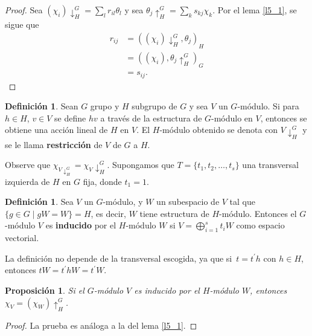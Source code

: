 \documentclass[12pt]{book}
\newtheorem{proposition}[theorem]{Proposición}
\theoremstyle{definition}
\newtheorem{definition}[theorem]{Definición}
\newcounter{in}
\newcounter{ini}
\begin{document}
\begin{proof}
  Sea $(\chi_{i})\downarrow^{G}_{H} = \sum_{l} r_{il} \theta_{l}$ y sea
  $\theta_{j}\uparrow^{G}_{H} = \sum_{k} s_{kj} \chi_{k}$. Por el lema \ref{l5_1}, se
  sigue que
  \begin{equation}
    \label{eq:66}
    \begin{aligned}
      r_{ij} &= ((\chi_{i})\downarrow^{G}_{H},\theta_{j})_{H} \\
      &= ((\chi_{i}),\theta_{j}\uparrow^{G}_{H})_{G}\\
      &= s_{ij}.
    \end{aligned}
  \end{equation}
\end{proof}
\begin{mdframed}
\begin{definition}
  Sean $G$ grupo y $H$ subgrupo de $G$ y sea $V$ un $G$-módulo. 
  Si para $h\in H$, $v\in V$ se define $hv$ a través de la estructura de
  $G$-módulo en $V$, entonces se obtiene una acción lineal de $H$ en $V$. El
  $H$-módulo obtenido se denota con $V\downarrow^{G}_{H}$ y se le
  llama \textbf{restricción} de $V$ de $G$ a $H$.
\end{definition}
Observe que
$\chi_{V\downarrow^{G}_{H}}=\chi_{V}\!\downarrow^{G}_{H}$. Supongamos
que $T=\{t_{1},t_{2},\ldots,t_{s}\}$ una transversal izquierda de $H$
en $G$ fija, donde $t_{1}=1$.
\begin{definition}
\label{mod_ind}
  Sea $V$ un $G$-módulo, y $W$ un subespacio de $V$ tal que $\{g\in
  G\mid gW=W\}=H$, es decir, $W$ tiene estructura de $H$-módulo. Entonces el
  $G$-módulo $V$ es \textbf{inducido} por el $H$-módulo $W$ si
  $V=\bigoplus^{s}_{i=1}t_{i}W$ como espacio vectorial.
\end{definition}
La definición no depende de la transversal escogida, ya que
si~$t=t^{'}h$ con $h\in H$, entonces $tW=t^{'}hW=t^{'}W$.
\begin{proposition}
  \label{car-ind-W-V}
  Si el $G$-módulo $V$ es inducido por el $H$-módulo $W$, entonces
  $\chi_{V}=(\chi_{W})\uparrow^{G}_{H}$.
\end{proposition}
\begin{proof}
La prueba es análoga a la del lema \ref{l5_1}.
\end{proof}
\end{mdframed}
\end{document}
